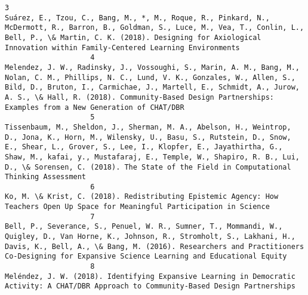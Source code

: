 \documentclass[journal,twocolumn]{IEEEtran}
\begin{document}
\begin{Verbatim}[commandchars=\\\{\}]
                    3                                                                                                                                                                     Suárez, E., Tzou, C., Bang, M., *, M., Roque, R., Pinkard, N., McDermott, R., Barron, B., Goldman, S., Luce, M., Vea, T., Conlin, L., Bell, P., \& Martin, C. K. (2018). Designing for Axiological Innovation within Family-Centered Learning Environments
                    4                                                                                                    Melendez, J. W., Radinsky, J., Vossoughi, S., Marin, A. M., Bang, M., Nolan, C. M., Phillips, N. C., Lund, V. K., Gonzales, W., Allen, S., Bild, D., Bruton, I., Carmichae, J., Martell, E., Schmidt, A., Jurow, A. S., \& Hall, R. (2018). Community-Based Design Partnerships: Examples from a New Generation of CHAT/DBR
                    5                                                        Tissenbaum, M., Sheldon, J., Sherman, M. A., Abelson, H., Weintrop, D., Jona, K., Horn, M., Wilensky, U., Basu, S., Rutstein, D., Snow, E., Shear, L., Grover, S., Lee, I., Klopfer, E., Jayathirtha, G., Shaw, M., kafai, y., Mustafaraj, E., Temple, W., Shapiro, R. B., Lui, D., \& Sorensen, C. (2018). The State of the Field in Computational Thinking Assessment
                    6                                                                                                                                                                                                                                                                                               Ko, M. \& Krist, C. (2018). Redistributing Epistemic Agency: How Teachers Open Up Space for Meaningful Participation in Science 
                    7                                                                                                                                              Bell, P., Severance, S., Penuel, W. R., Sumner, T., Mommandi, W., Quigley, D., Van Horne, K., Johnson, R., Stromholt, S., Lakhani, H., Davis, K., Bell, A., \& Bang, M. (2016). Researchers and Practitioners Co-Designing for Expansive Science Learning and Educational Equity 
                    8                                                                                                                                                                                                                                                                                     Meléndez, J. W. (2018). Identifying Expansive Learning in Democratic Activity: A CHAT/DBR Approach to Community-Based Design Partnerships

\end{Verbatim}
\end{document}
